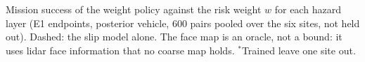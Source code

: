 Mission success of the weight policy against the risk weight $w$ for each hazard layer (E1 endpoints, posterior vehicle, 600 pairs pooled over the six sites, not held out). Dashed: the slip model alone. The face map is an oracle, not a bound: it uses lidar face information that no coarse map holds. $^{*}$Trained leave one site out.
